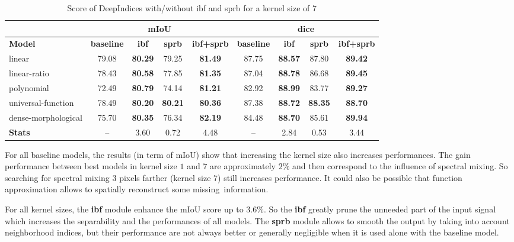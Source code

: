 \documentclass[../thesis.tex]{subfiles}
\begin{document}
	
	\begin{table}[H]
		\centering
		\small
		\begin{tabular} {|l| |c|c|c|c||c|c|c|c|}
			\hline & \multicolumn{4}{c||}{\textbf{mIoU}} & \multicolumn{4}{|c|}{\textbf{dice}} \\
			\hline \textbf{Model} & \textbf{baseline} &	\textbf{ibf} &	\textbf{sprb} &	\textbf{ibf+sprb}  &	\textbf{baseline}  &	\textbf{ibf} &	\textbf{sprb} &	\textbf{ibf+sprb}  \\ \hline
			linear &     79.08 &  \textbf{80.29} &  79.25 &     \textbf{81.49} &     87.75 &  \textbf{88.57} &  87.80 &     \textbf{89.42} \\
			linear-ratio &     78.43 &  \textbf{80.58} &  77.85 &     \textbf{81.35} &     87.04 &  \textbf{88.78} &  86.68 &     \textbf{89.45} \\
			polynomial &     72.49 &  \textbf{80.79} &  74.14 &     \textbf{81.21} &     82.92 &  \textbf{88.99} &  83.77 &     \textbf{89.27} \\
			universal-function &     78.49 &  \textbf{80.20} &  \textbf{80.21} &     \textbf{80.36} &     87.38 &  \textbf{88.72} &  \textbf{88.35} &     \textbf{88.70} \\
			dense-morphological &     75.70 &  \textbf{80.35} &  76.34 &     \textbf{82.19} &     84.48 &  \textbf{88.70} &  85.61 &     \textbf{89.94} \\ \hline
			\textbf{Stats} &       --  &   3.60 &   0.72 &      4.48 &       --  &   2.84 &   0.53 &      3.44 \\
			\hline
		\end{tabular}
		\caption{Score of DeepIndices with/without ibf and sprb for a kernel size of 7}
		\label{tab:generic-score-7}
	\end{table}

	For all baseline models, the results (in term of mIoU) show that increasing the kernel size also increases performances. The gain performance between best models in kernel size $1$ and $7$ are approximately $2\%$ and then correspond to the influence of spectral mixing. So searching for spectral mixing $3$ pixels farther (kernel size $7$) still increases performance. It could {also be possible that function approximation allows to spatially reconstruct some \mbox{missing information}.}
	
	For all kernel sizes, the \textbf{ibf} module enhance the mIoU score up to $3.6\%$. So the \textbf{ibf} greatly prune the unneeded part of the input signal which increases the separability and the performances of all models. The \textbf{sprb} module allows to smooth the output by taking into account neighborhood indices, but their performance are not always better or generally negligible when it is used alone with the baseline model.
	
\end{document}
